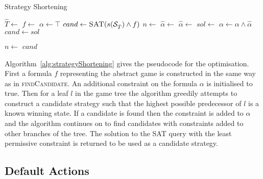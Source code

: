 \begin{algorithm}
    \caption{Strategy Shortening}
    \label{alg:strategyShortening}
    \begin{algorithmic}[1]
            \State $\hat{T} \gets $ 
            \State $f \gets $  \EndIfElse
            \State $\alpha \gets \top$
            \State $cand \gets \Call{SAT}{s(\cS_{\hat{T}}) \land f}$
                \State $n \gets $ 
                        \State $\hat{\alpha} \gets $ 
                    \Else
                    \State $\hat{\alpha} \gets $ 
                    \EndIf
                    \State $sol \gets $ 
                    \State $\alpha \gets \alpha \land \hat{\alpha}$
                        \State $cand \gets sol$
                        \Break
                    \EndIf
                        
                    \State $n \gets $ 
                \EndWhile
            \EndFor
            \State \Return $cand$
        \EndFunction
    \end{algorithmic}
\end{algorithm}

Algorithm~\ref{alg:strategyShortening} gives the pseudocode for the optimisation. First a formula $f$ representing the abstract game is constructed in the same way as in \textsc{findCandidate}. An additional constraint on the formula $\alpha$ is initialised to true. Then for a leaf $l$ in the game tree the algorithm greedily attempts to construct a candidate strategy such that the highest possible predecessor of $l$ is a known winning state. If a candidate is found then the constraint is added to $\alpha$ and the algorithm continues on to find candidates with constraints added to other branches of the tree. The solution to the SAT query with the least permissive constraint is returned to be used as a candidate strategy.

\subsection{Default Actions}

